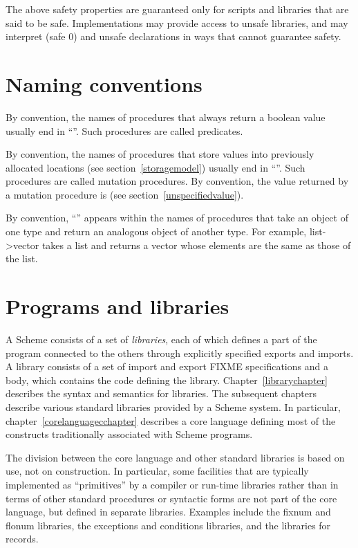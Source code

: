 The above safety properties are guaranteed only for scripts
and libraries that are said to be safe.  Implementations
may provide access to unsafe libraries, and may interpret
{\cf (safe 0)} and {\cf unsafe} declarations in ways that
cannot guarantee safety.

\section{Naming conventions}

By convention, the names of procedures that always return a boolean
value usually end
in ``''.  Such procedures are called predicates.

By convention, the names of procedures that store values into previously
allocated locations (see section~\ref{storagemodel}) usually end in
``\ide{!}''.
Such procedures are called mutation procedures.
By convention, the value returned by a mutation procedure is
\unspecifiedreturn{} (see section~\ref{unspecifiedvalue}).

By convention, ``\ide{->}'' appears within the names of procedures that
take an object of one type and return an analogous object of another type.
For example, {\cf list->vector} takes a list and returns a vector whose
elements are the same as those of the list.


	

\section{Programs and libraries}

A Scheme consists of a set of \textit{libraries}, each
of which defines a part of the program connected to the others through
explicitly specified exports and imports.  A library consists of a set
of import and export FIXME specifications and a body, which contains
the code defining the library.  Chapter~\ref{librarychapter} describes
the syntax and semantics for libraries.  The subsequent chapters
describe various standard libraries provided by a Scheme system.  In
particular, chapter~\ref{corelanguagecchapter} describes a core
language defining most of the constructs traditionally associated with
Scheme programs.

The division between the core language and other standard libraries is
based on use, not on construction.  In particular, some facilities
that are typically implemented as ``primitives'' by a compiler or
run-time libraries rather than in terms of other standard procedures
 or syntactic forms are not part of the core language, but defined in
separate libraries.  Examples include the fixnum and flonum libraries,
the exceptions and conditions libraries, and the libraries for
records.

